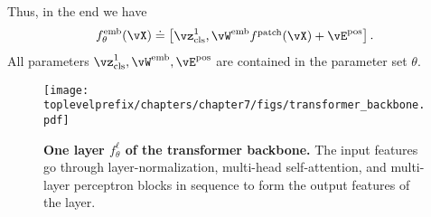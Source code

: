 \documentclass[../../book-main.tex]{subfiles}
\begin{document}
Thus, in the end we have 
\begin{equation}\label{eq:definition_of_embedding_module}
    f_{\theta}^{\emb}(\vX) \doteq \mat{\vz_{\cls}^{1}, \vW^{\emb}f^{\patch}(\vX) + \vE^{\pos}}.
\end{equation}
All parameters \(\vz_{\cls}^{1}, \vW^{\emb}, \vE^{\pos}\) are contained in the parameter set \(\theta\).

\begin{figure}
    \centering 
    \texttt{[image: \\toplevelprefix/chapters/chapter7/figs/transformer\_backbone.pdf]}
    \caption{\small\textbf{One layer \(f_{\theta}^{\ell}\) of the transformer backbone.} The input features go through layer-normalization, multi-head self-attention, and multi-layer perceptron blocks in sequence to form the output features of the layer.}
    \label{fig:transformer_backbone}
\end{figure}
\end{document}
